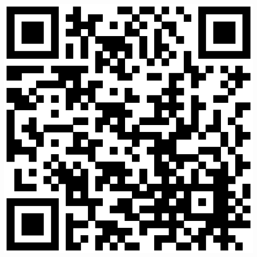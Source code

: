 \documentclass[a4paper]{curricula-vitae}
\begin{document}
\begin{minipage}[t]{0.33\textwidth}
\insertspace
\insertspace

\includegraphics[scale=0.25]{rick.eps}

\end{minipage} %
\hfill
\end{document}

